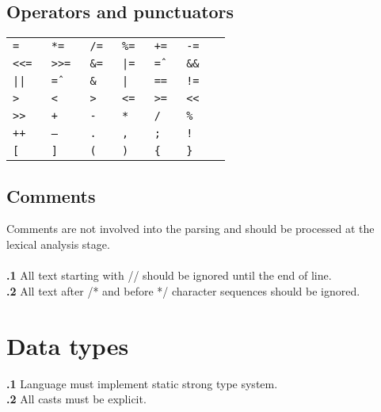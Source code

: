 \documentclass[leqno]{article}
\begin{document}
        \subsection{Operators and punctuators}
            \begin{tabular}{ R{1.5cm} R{1.5cm} R{1.5cm} R{1.5cm} R{1.5cm} R{1.5cm} R{1.5cm} }
                \tt{=}   & \tt{*=}     & \tt{/=}  & \tt{\%=} & \tt{+=}   & \tt{-=}   \\
                \tt{<<=} & \tt{>>=}    & \tt{\&=} & \tt{|=}  & \tt{\^=}  & \tt{\&\&} \\
                \tt{||}  & \tt{\^=}    & \tt{\&}  & \tt{|}   & \tt{==}   & \tt{!=}   \\
                \tt{>}   & \tt{<}      & \tt{>}   & \tt{<=}  & \tt{>=}   & \tt{<<}   \\
                \tt{>>}  & \tt{+}      & \tt{-}   & \tt{*}   & \tt{/}    & \tt{\%}   \\
                \tt{++}  & \tt{--}     & \tt{.}   & \tt{,}   & \tt{;}    & \tt{!}    \\
                \tt{[}   & \tt{]}      & \tt{(}   & \tt{)}   & \tt{\{}   & \tt{\}}   \\
            \end{tabular}

        \subsection{Comments}
            Comments are not involved into the parsing and should be processed at the
            lexical analysis stage. \\
            \\
            \textbf{\thesubsection.1} All text starting with // should be ignored until the end of line. \\
            \textbf{\thesubsection.2} All text after /*  and before */ character sequences should be ignored.

    \section{Data types}
        \upshape
            \textbf{\thesubsection.1} Language must implement static strong type system. \\
            \textbf{\thesubsection.2} All casts must be explicit.
\end{document}
